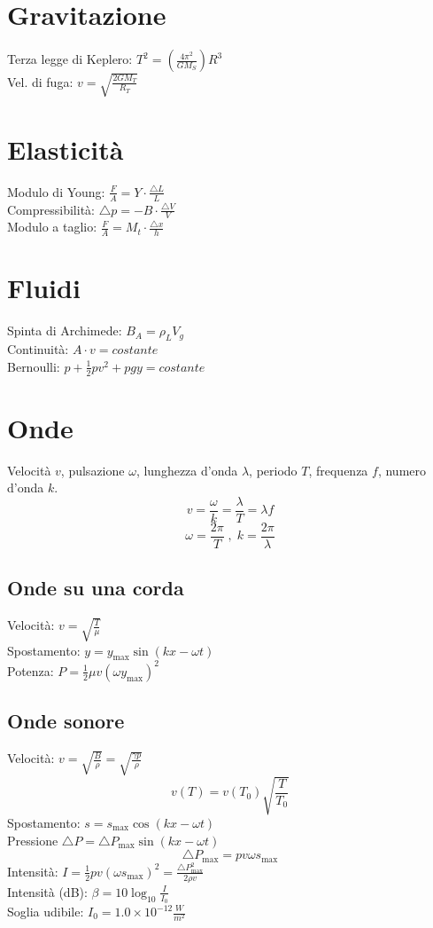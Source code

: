 \documentclass{article}
\begin{document}
\begin{small}
\begin{multicols}{3}
\section{Gravitazione}
		Terza legge di Keplero: $ T^2 = \left ( \frac{ 4 \pi^2 }{ GM_S } \right ) R^3 $ \\
		Vel. di fuga: $ v = \sqrt{ \frac{ 2 GM_T }{ R_T } } $
\section{Elasticità}
		Modulo di Young: $ \frac{ F }{ A } = Y \cdot \frac{ \triangle L }{ L } $ \\
		Compressibilità: $ \triangle p = - B \cdot \frac{ \triangle V }{ V } $ \\
		Modulo a taglio: $ \frac{ F }{ A } = M_t \cdot \frac{ \triangle x }{ h } $
\section{Fluidi}
		Spinta di Archimede: $ B_A = \rho_L V_g $ \\
		Continuità: $ A \cdot v = costante $ \\
		Bernoulli: $ p + \frac{1}{2} p v^2 + p g y = costante $
\section{Onde}
		Velocità $v$, pulsazione $\omega$, lunghezza d'onda $\lambda$, periodo $T$, frequenza $f$, numero d'onda $k$.
		\[ v = \frac{ \omega }{ k } = \frac{ \lambda }{ T } = \lambda f \]
		\[ \omega = \frac{ 2 \pi }{ T } \;,\; k = \frac{ 2 \pi }{ \lambda } \]
	\subsection{Onde su una corda}
		Velocità: $ v = \sqrt{ \frac{ T }{ \mu } } $ \\
		Spostamento: $ y = y_{\max} \sin ( k x - \omega t ) $ \\
		Potenza: $ P = \frac{1}{2} \mu v ( \omega y_{\max} )^2 $
	\subsection{Onde sonore}
		Velocità: $ v = \sqrt{ \frac{ B }{ \rho } } = \sqrt{ \frac{ \gamma p }{ \rho } } $
		\[ v ( T ) = v ( T_0 ) \sqrt{ \frac{ T }{ T_0 } } \]
		Spostamento: $ s = s_{\max} \cos ( k x - \omega t ) $ \\
		Pressione $ \triangle P = \triangle P_{\max} \sin ( k x - \omega t ) $
		\[ \triangle P_{\max} = p v \omega s_{\max} \]
		Intensità: $ I = \frac{1}{2} p v ( \omega s_{\max} )^2 = \frac{ \triangle P_{\max}^2 }{ 2 \rho v } $ \\
		Intensità (dB): $ \beta = 10 \log_{10} \frac{ I }{ I_0 } $ \\
		Soglia udibile: $ I_0 = 1.0 \times 10^{-12} \frac{ W }{ m^2 } $

\end{multicols}
\end{small}
\end{document}
